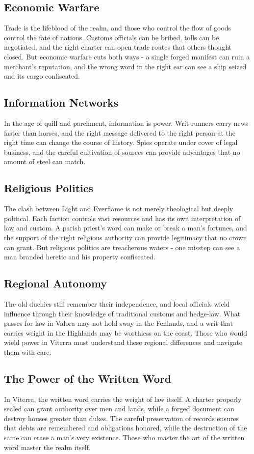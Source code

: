 \subsection*{Economic Warfare}
Trade is the lifeblood of the realm, and those who control the flow of goods control the fate of nations. Customs officials can be bribed, tolls can be negotiated, and the right charter can open trade routes that others thought closed. But economic warfare cuts both ways - a single forged manifest can ruin a merchant's reputation, and the wrong word in the right ear can see a ship seized and its cargo confiscated.

\subsection*{Information Networks}
In the age of quill and parchment, information is power. Writ-runners carry news faster than horses, and the right message delivered to the right person at the right time can change the course of history. Spies operate under cover of legal business, and the careful cultivation of sources can provide advantages that no amount of steel can match.

\subsection*{Religious Politics}
The clash between Light and Everflame is not merely theological but deeply political. Each faction controls vast resources and has its own interpretation of law and custom. A parish priest's word can make or break a man's fortunes, and the support of the right religious authority can provide legitimacy that no crown can grant. But religious politics are treacherous waters - one misstep can see a man branded heretic and his property confiscated.

\subsection*{Regional Autonomy}
The old duchies still remember their independence, and local officials wield influence through their knowledge of traditional customs and hedge-law. What passes for law in Valora may not hold sway in the Fenlands, and a writ that carries weight in the Highlands may be worthless on the coast. Those who would wield power in Viterra must understand these regional differences and navigate them with care.

\subsection*{The Power of the Written Word}
In Viterra, the written word carries the weight of law itself. A charter properly sealed can grant authority over men and lands, while a forged document can destroy houses greater than dukes. The careful preservation of records ensures that debts are remembered and obligations honored, while the destruction of the same can erase a man's very existence. Those who master the art of the written word master the realm itself.